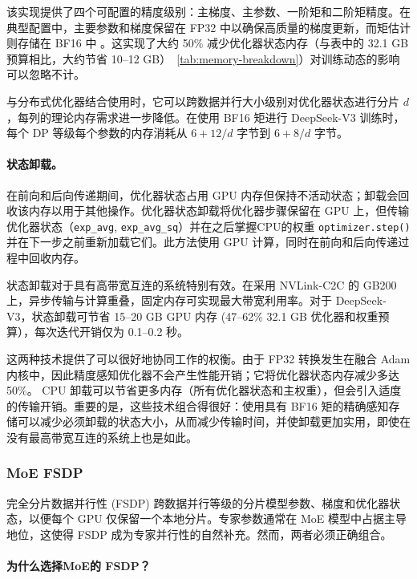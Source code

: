 \documentclass[10pt,logo,copyright]{nvidiatechreport_zh}
\begin{document}
该实现提供了四个可配置的精度级别：主梯度、主参数、一阶矩和二阶矩精度。在典型配置中，主要参数和梯度保留在 FP32 中以确保高质量的梯度更新，而矩估计则存储在 BF16 中 \cite{liu2024deepseek}。这实现了大约 50\% 减少优化器状态内存（与表中的 32.1 GB 预算相比，大约节省 10--12 GB）~\ref{tab:memory-breakdown}）对训练动态的影响可以忽略不计。

与分布式优化器结合使用时，它可以跨数据并行大小级别对优化器状态进行分片 $d$，每列的理论内存需求进一步降低。在使用 BF16 矩进行 DeepSeek-V3 训练时，每个 DP 等级每个参数的内存消耗从 $6+12/d$ 字节到 $6+8/d$ 字节。

\paragraph{状态卸载。}
在前向和后向传递期间，优化器状态占用 GPU 内存但保持不活动状态；卸载会回收该内存以用于其他操作。优化器状态卸载将优化器步骤保留在 GPU 上，但传输优化器状态（\texttt{exp\_avg}, \texttt{exp\_avg\_sq}）并在之后掌握CPU的权重 \texttt{optimizer.step()} 并在下一步之前重新加载它们。此方法使用 GPU 计算，同时在前向和后向传递过程中回收内存。

状态卸载对于具有高带宽互连的系统特别有效。在采用 NVLink-C2C 的 GB200 上，异步传输与计算重叠，固定内存可实现最大带宽利用率。对于 DeepSeek-V3，状态卸载可节省 15--20 GB GPU 内存 (47--62\% 32.1 GB 优化器和权重预算），每次迭代开销仅为 0.1--0.2 秒。

这两种技术提供了可以很好地协同工作的权衡。由于 FP32 转换发生在融合 Adam 内核中，因此精度感知优化器不会产生性能开销；它将优化器状态内存减少多达 50\%。 CPU 卸载可以节省更多内存（所有优化器状态和主权重），但会引入适度的传输开销。重要的是，这些技术组合得很好：使用具有 BF16 矩的精确感知存储可以减少必须卸载的状态大小，从而减少传输时间，并使卸载更加实用，即使在没有最高带宽互连的系统上也是如此。

\subsubsection{MoE FSDP}\label{sec:fsdp-ref}

完全分片数据并行性 (FSDP) \cite{zhao2023pytorchfsdp,rajbhandari2020zero} 跨数据并行等级的分片模型参数、梯度和优化器状态，​​以便每个 GPU 仅保留一个本地分片。专家参数通常在 MoE 模型中占据主导地位，这使得 FSDP 成为专家并行性的自然补充。然而，两者必须正确组合。

\paragraph{为什么选择MoE的 FSDP？}
\end{document}
